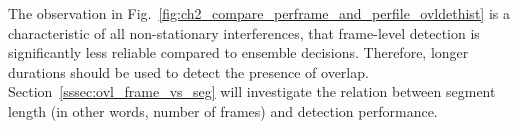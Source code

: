 {The observation in Fig.~\ref{fig:ch2_compare_perframe_and_perfile_ovldethist} is a characteristic of all non-stationary interferences, that frame-level detection is significantly less reliable compared to ensemble decisions. 
Therefore, longer durations should be used to detect the presence of overlap. 
Section~\ref{sssec:ovl_frame_vs_seg} will investigate the relation between segment length (in other words, number of frames) and detection performance. 


}
